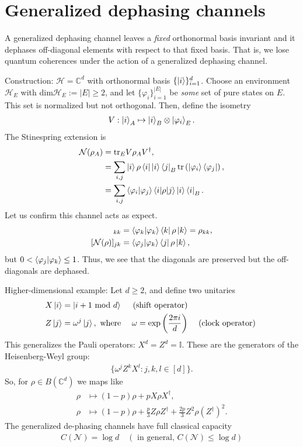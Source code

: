 \documentclass[../../note.tex]{subfiles}
\begin{document}
\section{Generalized dephasing channels}
A generalized dephasing channel leaves a \textit{fixed} orthonormal basis invariant and it dephases off-diagonal elements with respect to that fixed basis. That is, we lose quantum coherences under the action of a generalized dephasing channel. 

Construction: $\mathcal{H}=\mathbb{C}^d$ with orthonormal basis $\{\ket{i}\}_{i=1}^d$. Choose an environment $\mathcal{H}_E$ with dim$\mathcal{H}_E :=|E| \geq 2$, and let $\{\varphi_i\}_{i=1}^{|E|}$ be \textit{some} set of pure states on $E$. This set is normalized but not orthogonal. Then, define the isometry
\begin{align}
   V: \ket{i}_A \mapsto \ket{i}_B \otimes \ket{\varphi_i}_E.
\end{align}
The Stinespring extension is
\begin{align}
    \mathcal{N}(\rho_A) &= \text{tr}_E V \rho_A V^{\dagger}, \\
    &= \sum_{i,j} \ket{i}\rho \bra{i} \ket{i}\bra{j}_B \text{tr}\left(\ket{\varphi_i}\bra{\varphi_j}\right),\\
    &=\sum_{i,j} \braket{\varphi_i|\varphi_j} \braket{i|\rho|j} \ket{i}\bra{i}_B.
\end{align}
Let us confirm this channel acts as expect. 
\begin{align}
    [\mathcal{N}(\rho)]_{kk} &= \braket{\varphi_k|\varphi_k} \bra{k}\rho \ket{k} = \rho_{kk}, \\
    [\mathcal{N}(\rho)]_{jk} &=\braket{\varphi_j|\varphi_k} \bra{j}\rho \ket{k},
\end{align}
but $0 < \braket{\varphi_j|\varphi_k} \leq 1$. Thus, we see that the diagonals are preserved but the off-diagonals are dephased. 

Higher-dimensional example: Let $d\geq 2$, and define two unitaries 
\begin{align}
    X\ket{i} &= \ket{i+1 \text{ mod } d} \quad \text{ (shift operator) } \\
    Z\ket{j} &= \omega^j \ket{j}, \text{ where } \quad \omega=\exp{\left(\frac{2 \pi i}{d}\right)} \quad \text{ (clock operator) }
\end{align}
This generalizes the Pauli operators: $X^d=Z^d = \mathbb{I}$. These are the generators of the Heisenberg-Weyl group:
\begin{align}
    \{\omega^j Z^k X^l : j,k,l \in [d]\}.
\end{align}
So, for $\rho \in B(\mathbb{C}^d)$ we maps like 
\begin{align}
    \rho &\mapsto (1-p)\rho + p X\rho X^{\dagger}, \\
    \rho &\mapsto (1-p)\rho +\frac{p}{3} Z\rho Z^{\dagger} + \frac{2p}{3} Z^2 \rho (Z^{\dagger})^2.
\end{align}
The generalized de-phasing channels have full classical capacity 
\begin{align}
    C(\mathcal{N})=\log{d} \quad (\text{ in general, } C(\mathcal{N})\leq \log{d})
\end{align}
\end{document}
